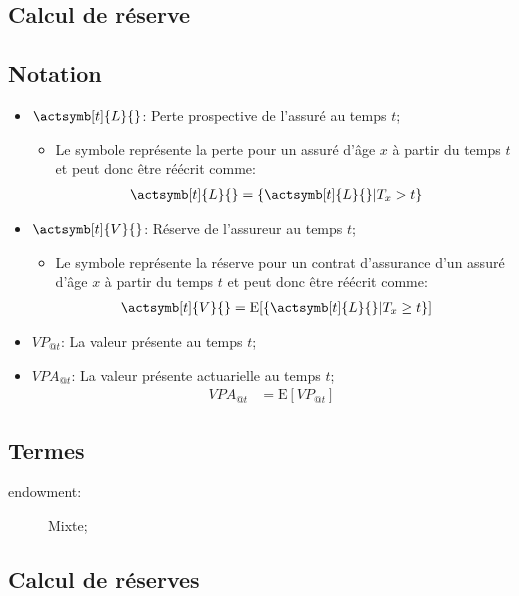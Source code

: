 \documentclass[10pt, french]{article}
\begin{document}
\begin{multicols*}{2} 

\section{Calcul de réserve}

\subsection*{Notation}
\begin{itemize}
	\item[] 	$\actsymb[t]{L}{}$: Perte prospective de l'assuré au temps $t$;
		\begin{itemize}
		\item	Le symbole représente la perte pour un assuré d'âge $x$ à partir du temps $t$ et peut donc être réécrit comme:
			\begin{align*}
			\actsymb[t]{L}{}	
			&=	\{ \actsymb[t]{L}{} | T_{x} > t \}
			\end{align*}
		\end{itemize}
	\item[]	$\actsymb[t]{V}{}$: Réserve de l'assureur au temps $t$;
		\begin{itemize}
		\item	Le symbole représente la réserve pour un contrat d'assurance d'un assuré d'âge $x$ à partir du temps $t$ et peut donc être réécrit comme:
			\begin{align*}
			\actsymb[t]{V}{}	
			&=	\text{E}[\{ \actsymb[t]{L}{} | T_{x} \ge t \}]
			\end{align*}
		\end{itemize}
	\item[]	$VP_{@t}$: La valeur présente au temps $t$;
	\item[]	$VPA_{@t}$: La valeur présente actuarielle au temps $t$;
		\begin{align*}
		VPA_{@t}	
		&=	\text{E}[VP_{@t}]
		\end{align*}
\end{itemize}

\subsection*{Termes}
\begin{description}
	\item[endowment:] Mixte;
\end{description}

\subsection*{Calcul de réserves}


\end{multicols*}
\end{document}
